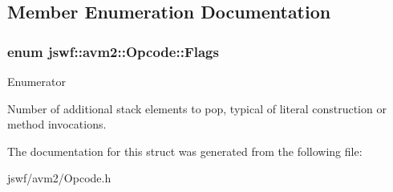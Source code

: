 \subsection{Member Enumeration Documentation}
\hypertarget{structjswf_1_1avm2_1_1_opcode_a5454d0bfca332ead7135c42d76477e4c}{
\subsubsection[{Flags}]{\setlength{\rightskip}{0pt plus 5cm}enum {\bf jswf\+::avm2\+::\+Opcode\+::\+Flags}}}\label{structjswf_1_1avm2_1_1_opcode_a5454d0bfca332ead7135c42d76477e4c}
\begin{Desc}
\item[Enumerator]\par
\begin{description}
\item[{\em 
\hypertarget{structjswf_1_1avm2_1_1_opcode_a5454d0bfca332ead7135c42d76477e4caa309032a1a0b42c33390ffbad794a482}{Has\+Argument\+Count\+Flag}\label{structjswf_1_1avm2_1_1_opcode_a5454d0bfca332ead7135c42d76477e4caa309032a1a0b42c33390ffbad794a482}
}]Number of additional stack elements to pop, typical of literal construction or method invocations. \end{description}
\end{Desc}


The documentation for this struct was generated from the following file\+:\begin{DoxyCompactItemize}
\item 
jswf/avm2/Opcode.\+h\end{DoxyCompactItemize}
